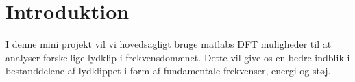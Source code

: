 \section{Introduktion}
I denne mini projekt vil vi hovedsagligt bruge matlabs DFT muligheder til at analyser forskellige lydklip i frekvensdomænet. Dette vil give os en bedre indblik i bestanddelene af lydklippet i form af fundamentale frekvenser, energi og støj. 
